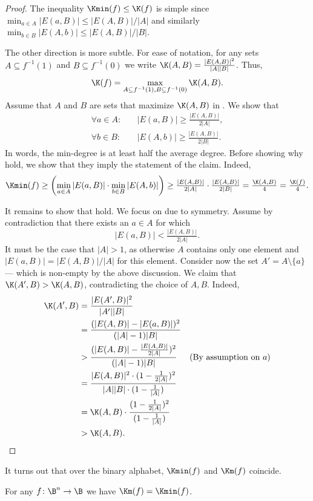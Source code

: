 \begin{proof}
The inequality $\Kmin(f)\le\K(f)$ is simple since $\min_{a\in A}{|E(a,B)|}\le|E(A,B)|/|A|$
and similarly $\min_{b\in B}{|E(A,b)|}\le|E(A,B)|/|B|$.

The other direction is more subtle. For ease of notation, for any
sets $A\subseteq f^{-1}(1)$ and $B\subseteq f^{-1}(0)$ we 
%
write %
$\K(A,B)=\frac{|E(A,B)|^{2}}{|A||B|}$. Thus, 
\begin{equation}
\K(f)=\max_{A\subseteq f^{-1}(1),B\subseteq f^{-1}(0)}\K(A,B).\label{eq:K(AB)}
\end{equation}
Assume that $A$ and $B$ are sets that maximize $\K(A,B)$ in .
We show that 
\begin{align}
\forall{a\in A}\colon & \quad|E(a,B)|\ge\tfrac{|E(A,B)|}{2|A|},\label{eq:min deg A}\\
\forall{b\in B}\colon & \quad|E(A,b)|\ge\tfrac{|E(A,B)|}{2|B|}.\label{eq:min deg B}
\end{align}
In words, the min-degree is at least half the average degree. Before
showing why 
 hold, we show that they
imply the statement of the claim. Indeed, 
\[
\Kmin(f)\ge\left(\min_{a\in A}{|E(a,B)|}\cdot\min_{b\in B}{|E(A,b)|}\right)\ge\tfrac{|E(A,B)|}{2|A|}\cdot\tfrac{|E(A,B)|}{2|B|}=\tfrac{\K(A,B)}{4}=\tfrac{\K(f)}{4}.
\]

It remains to show that 
 hold. We
focus on  due to symmetry. Assume by contradiction
that there exists an $a\in A$ for which 
\[
|E(a,B)|<\tfrac{|E(A,B)|}{2|A|}.
\]
It must be the case that $|A|>1$, as otherwise $A$ contains only
one element and $|E(a,B)|=|E(A,B)|/|A|$ for this element. Consider
now the set $A'=A\setminus\{a\}$ --- which is non-empty by the above
discussion. We claim that $\K(A',B)>\K(A,B)$, contradicting the choice
of $A,B$. Indeed, 
\begin{align*}
\K(A',B) & =\frac{|E(A',B)|^{2}}{|A'||B|}\\
 & =\frac{(|E(A,B)|-|E(a,B)|)^{2}}{(|A|-1)|B|}\\
 & >\frac{(|E(A,B)|-\frac{|E(A,B)|}{2|A|})^{2}}{(|A|-1)|B|} & \text{(By assumption on \ensuremath{a})}\\
 & =\frac{|E(A,B)|^{2}\cdot(1-\frac{1}{2|A|})^{2}}{|A||B|\cdot(1-\frac{1}{|A|})}\\
 & =\K(A,B)\cdot\frac{(1-\frac{1}{2|A|})^{2}}{(1-\frac{1}{|A|})}\\
 & >\K(A,B). & \qedhere
\end{align*}
\end{proof}
It turns out that over the binary alphabet, $\Kmin(f)$ and $\Km(f)$
coincide. 
\begin{claim}
\label{claim:Km-Kmin} For any $f\colon\B^{n}\to\B$ we have $\Km(f)=\Kmin(f)$. 
\end{claim}


